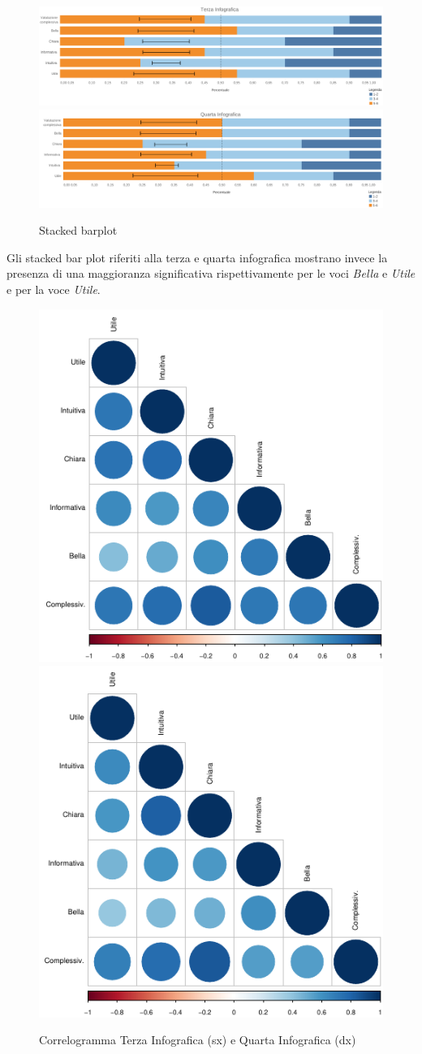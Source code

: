 	\begin{figure}[h]
			\centering
			\includegraphics[width=1\linewidth]{imgs/vis3.png}
			\includegraphics[width=1\linewidth]{imgs/vis4.png}
			\caption{Stacked barplot}
			\label{fig:Terza infografica11}
		\end{figure}

Gli stacked bar plot riferiti alla terza e quarta infografica mostrano invece la presenza di una maggioranza significativa rispettivamente per le voci \textit{Bella} e \textit{Utile} e per la voce \textit{Utile}.  

\begin{figure}[h]
			\centering
			\includegraphics[width=0.4\linewidth]{imgs/corrVIS3.png}
			\includegraphics[width=0.4\linewidth]{imgs/corrVIS4.png}
			\caption{Correlogramma Terza Infografica (sx) e Quarta Infografica (dx)}
			\label{fig:Terza infografica111}
		\end{figure}

